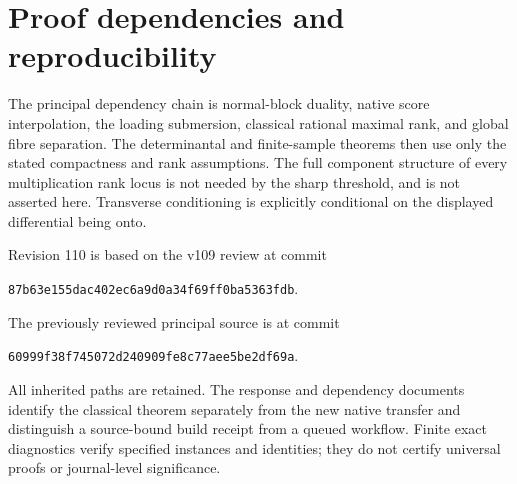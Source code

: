 \documentclass[11pt,reqno]{amsart}
\numberwithin{equation}{section}
\theoremstyle{definition}\newtheorem{definition}[theorem]{Definition}
\theoremstyle{remark}\newtheorem{remark}[theorem]{Remark}
\begin{document}
\section{Proof dependencies and reproducibility}
The principal dependency chain is normal-block duality, native score interpolation, the loading submersion, classical rational maximal rank, and global fibre separation. The determinantal and finite-sample theorems then use only the stated compactness and rank assumptions. The full component structure of every multiplication rank locus is not needed by the sharp threshold, and is not asserted here. Transverse conditioning is explicitly conditional on the displayed differential being onto.

Revision 110 is based on the v109 review at commit
\par\noindent\texttt{87b63e155dac402ec6a9d0a34f69ff0ba5363fdb}.\par
The previously reviewed principal source is at commit
\par\noindent\texttt{60999f38f745072d240909fe8c77aee5be2df69a}.\par
All inherited paths are retained. The response and dependency documents identify the classical theorem separately from the new native transfer and distinguish a source-bound build receipt from a queued workflow. Finite exact diagnostics verify specified instances and identities; they do not certify universal proofs or journal-level significance.
\end{document}
